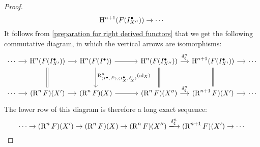 \begin{proof}
\[    \operatorname{H}^{n+1}(F(I^\bullet_{X''}))
    \to
    \dotsb
  \]
  It follows from \cref{preparation for right derived functors} that we get the following commutative diagram, in which the vertical arrows are isomorphisms:
  \[
    \begin{tikzcd}[column sep = small, row sep = large]
        \dotsb
        \arrow{r}
      & \Hl^n(F(\Iccc_{X'}))
        \arrow{r}
        \arrow[equal]{d}
      & \Hl^n(F(\Iccc))
        \arrow{rr}
        \arrow{d}[right]{\Right^n_{(\Iccc, i^0),(\Iccc_X, i_X^0)}(\id_X)}
      & {}
      & \Hl^n(F(\Iccc_{X''}))
        \arrow{r}[above]{\delta^n_\xi}
        \arrow[equal]{d}
      & \Hl^{n+1}(F(\Iccc_{X'}))
        \arrow{r}
        \arrow[equal]{d}
      & \dotsb
      \\
        \dotsb
        \arrow{r}
      & (\Right^n F)(X')
        \arrow{r}
      & (\Right^n F)(X)
        \arrow{rr}
      & {}
      & (\Right^n F)(X'')
        \arrow{r}[above]{\delta^n_\xi}
      & (\Right^{n+1} F)(X')
        \arrow{r}
      & \dotsb
    \end{tikzcd}
  \]
  The lower row of this diagram is therefore a long exact sequence:
  \[
    \dotsb
    \to
    (\Right^n F)(X')
    \to
    (\Right^n F)(X)
    \to
    (\Right^n F)(X'')
    \xlongto{ \delta^n_\xi }
    (\Right^{n+1} F)(X')
    \to
    \dotsb
  \]
  

\end{proof}
